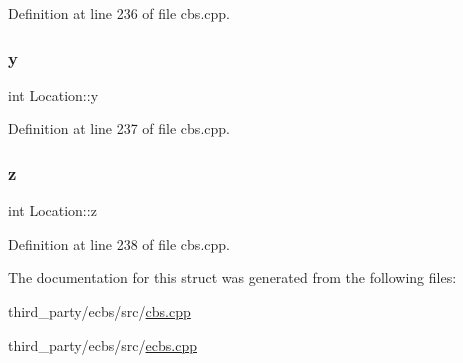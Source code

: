 Definition at line 236 of file cbs.\+cpp.

\mbox{\label{struct_location_a307809776b981810147af56d9304e273}} 
\subsubsection{\texorpdfstring{y}{y}}
{\footnotesize\ttfamily int Location\+::y}



Definition at line 237 of file cbs.\+cpp.

\mbox{\label{struct_location_ad46e606795ee67a3775a53da49b37284}} 
\subsubsection{\texorpdfstring{z}{z}}
{\footnotesize\ttfamily int Location\+::z}



Definition at line 238 of file cbs.\+cpp.



The documentation for this struct was generated from the following files\+:\begin{DoxyCompactItemize}
\item 
third\+\_\+party/ecbs/src/\hyperlink{cbs_8cpp}{cbs.\+cpp}\item 
third\+\_\+party/ecbs/src/\hyperlink{ecbs_8cpp}{ecbs.\+cpp}\end{DoxyCompactItemize}
